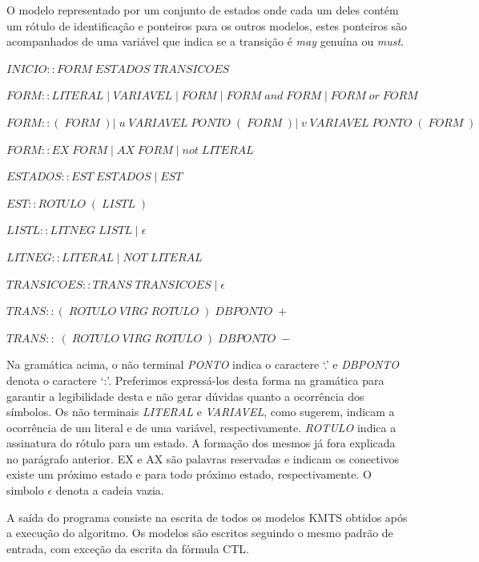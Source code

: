 \documentclass[normaltoc,capchap,capsec,times]{abnt}
\begin{document}
O modelo representado por um conjunto de estados onde cada um deles contém um rótulo de identificação e ponteiros para os outros modelos, estes ponteiros são acompanhados de uma variável que indica se a transição é \textit{may} genuína ou \textit{must}. 

$ INICIO :: FORM \; ESTADOS \; TRANSICOES$

$ FORM :: LITERAL \; \vert \; VARIAVEL \; \vert \; FORM \; \vert \; FORM \; and \; FORM \; \vert \; FORM \; or \; FORM $

$FORM :: ( \; FORM \; ) \vert \; u \; VARIAVEL \; PONTO \; ( \; FORM\;) \vert \; v \; VARIAVEL \; PONTO \; ( \; FORM\;) $

$FORM :: EX \; FORM \; \vert \; AX \; FORM \; \vert \; not \; LITERAL$

$ESTADOS :: EST \; ESTADOS \; \vert \; EST$

$EST :: ROTULO \; ( \; LISTL \; )$

$LISTL :: LITNEG \; LISTL \; \vert \; \epsilon$

$LITNEG :: LITERAL \; \vert \; NOT \; LITERAL$

$TRANSICOES :: TRANS \; TRANSICOES \; \vert \; \epsilon$

$TRANS :: ( \; ROTULO \; VIRG \; ROTULO \; ) \; DBPONTO \;  + \;$

$TRANS :: \; ( \; ROTULO \; VIRG \; ROTULO \; ) \; DBPONTO \;  -$


Na gramática acima, o não terminal \textit{PONTO} indica o caractere `.' e \textit{DBPONTO} denota o caractere `:'. Preferimos expressá-los desta forma na gramática para garantir a legibilidade desta e não gerar dúvidas quanto a ocorrência dos símbolos. Os não terminais \textit{LITERAL} e \textit{VARIAVEL}, como sugerem, indicam a ocorrência de um literal e de uma variável, respectivamente. \textit{ROTULO} indica a assinatura do rótulo para um estado. A formação dos mesmos já fora explicada no parágrafo anterior. EX e AX são palavras reservadas e indicam os conectivos existe um próximo estado e para todo próximo estado, respectivamente. O simbolo $\epsilon$ denota a cadeia vazia.

A saída do programa consiste na escrita de todos os modelos KMTS obtidos após a execução do algoritmo. Os modelos são escritos seguindo o mesmo padrão de entrada, com exceção da escrita da fórmula CTL. %
\end{document}
